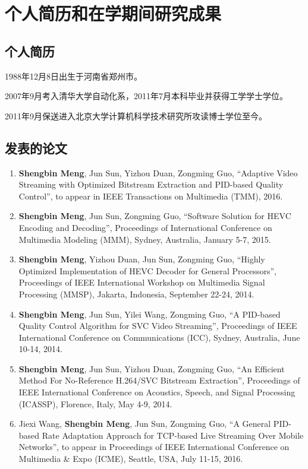 \chapter{个人简历和在学期间研究成果}

\section*{个人简历}

1988年12月8日出生于河南省郑州市。

2007年9月考入清华大学自动化系，2011年7月本科毕业并获得工学学士学位。

2011年9月保送进入北京大学计算机科学技术研究所攻读博士学位至今。

\renewcommand{\labelenumi}{[\arabic{enumi}]}

\section*{发表的论文}
\begin{enumerate}
	\item \textbf{Shengbin Meng}, Jun Sun, Yizhou Duan, Zongming Guo, ``Adaptive Video Streaming with Optimized Bitstream Extraction and PID-based Quality Control'', to appear in IEEE Transactions on Multimedia (TMM), 2016.
	\item \textbf{Shengbin Meng}, Jun Sun, Zongming Guo, ``Software Solution for HEVC Encoding and Decoding'', Proceedings of International Conference on Multimedia Modeling (MMM), Sydney, Australia, January 5-7, 2015.
	\item \textbf{Shengbin Meng}, Yizhou Duan, Jun Sun, Zongming Guo, ``Highly Optimized Implementation of HEVC Decoder for General Processors'', Proceedings of IEEE International Workshop on Multimedia Signal Processing (MMSP), Jakarta, Indonesia, September 22-24, 2014.
	\item \textbf{Shengbin Meng}, Jun Sun, Yilei Wang, Zongming Guo, ``A PID-based Quality Control Algorithm for SVC Video Streaming'', Proceedings of IEEE International Conference on Communications (ICC), Sydney, Australia, June 10-14, 2014.
	\item \textbf{Shengbin Meng}, Jun Sun, Yizhou Duan, Zongming Guo, ``An Efficient Method For No-Reference H.264/SVC Bitstream Extraction'', Proceedings of IEEE International Conference on Acoustics, Speech, and Signal Processing (ICASSP), Florence, Italy, May 4-9, 2014.
	\item Jiexi Wang, \textbf{Shengbin Meng}, Jun Sun, Zongming Guo, ``A General PID-based Rate Adaptation Approach for TCP-based Live Streaming Over Mobile Networks'', to appear in Proceedings of IEEE International Conference on Multimedia \& Expo (ICME), Seattle, USA, July 11-15, 2016.
\end{enumerate}

